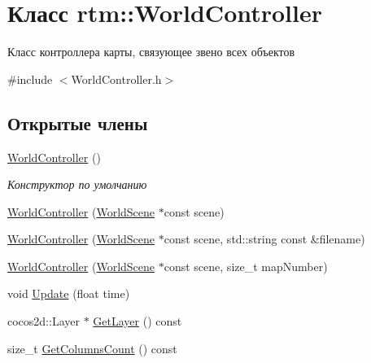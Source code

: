 \hypertarget{classrtm_1_1_world_controller}{}\section{Класс rtm\+:\+:World\+Controller}
\label{classrtm_1_1_world_controller}


Класс контроллера карты, связующее звено всех объектов  




{\ttfamily \#include $<$World\+Controller.\+h$>$}

\subsection*{Открытые члены}
\begin{DoxyCompactItemize}
\item 
\mbox{\label{classrtm_1_1_world_controller_a177ef24d8d2c834ca1c3d0ed5b9dff02}} 
\hyperlink{classrtm_1_1_world_controller_a177ef24d8d2c834ca1c3d0ed5b9dff02}{World\+Controller} ()
\begin{DoxyCompactList}\small\item\em Конструктор по умолчанию \end{DoxyCompactList}\item 
\hyperlink{classrtm_1_1_world_controller_a6c7b626c306b63f5799ed3b37e7de7a4}{World\+Controller} (\hyperlink{classrtm_1_1_world_scene}{World\+Scene} $\ast$const scene)
\item 
\hyperlink{classrtm_1_1_world_controller_abe5fb63dc74f98dd25e1896d567d5caf}{World\+Controller} (\hyperlink{classrtm_1_1_world_scene}{World\+Scene} $\ast$const scene, std\+::string const \&filename)
\item 
\hyperlink{classrtm_1_1_world_controller_ac2f5bcddd4192807bb5ea30440d3defc}{World\+Controller} (\hyperlink{classrtm_1_1_world_scene}{World\+Scene} $\ast$const scene, size\+\_\+t map\+Number)
\item 
void \hyperlink{classrtm_1_1_world_controller_a6b97a9ccc241734be2d68198de15068f}{Update} (float time)
\item 
cocos2d\+::\+Layer $\ast$ \hyperlink{classrtm_1_1_world_controller_a74bfc6a22a7091dc2668b08cd79f8aca}{Get\+Layer} () const
\item 
size\+\_\+t \hyperlink{classrtm_1_1_world_controller_af845be3c9945c0a2250f32e134a04294}{Get\+Columns\+Count} () const
\item 

\end{DoxyCompactItemize}
